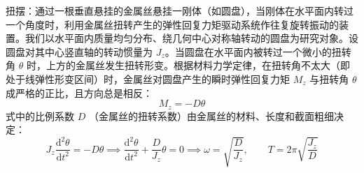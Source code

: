\begin{definition}[扭摆]
扭摆：通过一根垂直悬挂的金属丝悬挂一刚体（如圆盘），当刚体在水平面内转过一个角度时，利用金属丝扭转产生的弹性回复力矩驱动系统作往复旋转振动的装置。我们以水平面内质量均匀分布、绕几何中心对称轴转动的圆盘为研究对象。设圆盘对其中心竖直轴的转动惯量为 $J_z$。当圆盘在水平面内被转过一个微小的扭转角 $\theta$ 时，上方的金属丝发生扭转形变。根据材料力学定律，在扭转角不太大（即处于线弹性形变区间）时，金属丝对圆盘产生的瞬时弹性回复力矩 $M_z$ 与扭转角 $\theta$ 成严格的正比，且方向总是相反：$$M_z = -D\theta$$式中的比例系数 $D$ （金属丝的扭转系数）由金属丝的材料、长度和截面粗细决定：$$J_z \frac{\mathrm{d}^2\theta}{\mathrm{d}t^2} = -D\theta \implies \frac{\mathrm{d}^2\theta}{\mathrm{d}t^2} + \frac{D}{J_z}\theta = 0\implies\boxed{\omega = \sqrt{\frac{D}{J_z}}, \qquad T = 2\pi\sqrt{\frac{J_z}{D}}}$$
\end{definition}

